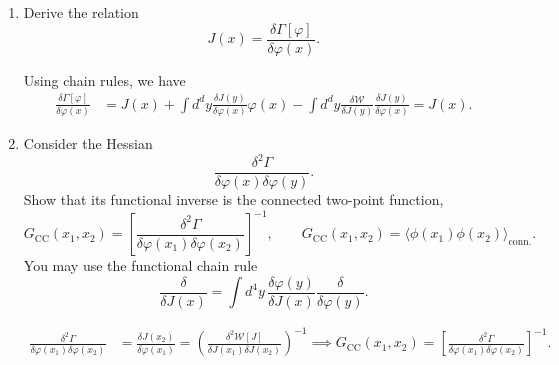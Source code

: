 \begin{enumerate}[label=\alph*)]
    \item Derive the relation
    \begin{equation}
        J(x)=\frac{\delta\Gamma[\varphi]}{\delta\varphi(x)}.
    \end{equation}
    \begin{solution}
    Using chain rules, we have
        \begin{equation}
            \begin{aligned}
                \frac{\delta\Gamma[\varphi]}{\delta\varphi(x)}
                &= J(x) + \int d^dy\frac{\delta J(y)}{\delta\varphi(x)}\varphi(x) - \int d^dy\frac{\delta \mathcal{W}}{\delta J(y)}\frac{\delta J(y)}{\delta    \varphi(x)}=J(x).
            \end{aligned}
        \end{equation}
    \end{solution}

    \item Consider the Hessian
    \begin{equation}
        \frac{\delta^2\Gamma}
             {\delta\varphi(x)\delta\varphi(y)}.
    \end{equation}
    Show that its functional inverse is the connected two-point function,
    \begin{equation}
        G_{\mathrm{CC}}(x_1,x_2)
        =\left[
            \frac{\delta^2\Gamma}
                 {\delta\varphi(x_1)\delta\varphi(x_2)}
        \right]^{-1},
        \qquad
        G_{\mathrm{CC}}(x_1,x_2)
        =\langle\phi(x_1)\phi(x_2)\rangle_{\mathrm{conn.}}.
    \end{equation}
    You may use the functional chain rule
    \begin{equation}
        \frac{\delta}{\delta J(x)}
        =\int d^4y\,
        \frac{\delta\varphi(y)}{\delta J(x)}
        \frac{\delta}{\delta\varphi(y)}.
    \end{equation}
    \begin{solution}
        \begin{equation}
            \begin{aligned}
                \frac{\delta^2\Gamma}
             {\delta\varphi(x_1)\delta\varphi(x_2)} &= \frac{\delta J(x_2)}{\delta \varphi(x_1)} = \left(\frac{\delta^2\mathcal{W}[J]}{\delta J(x_1)\delta J(x_2)}\right)^{-1} \implies G_\mathrm{CC}(x_1,x_2) =\left[
            \frac{\delta^2\Gamma}
                 {\delta\varphi(x_1)\delta\varphi(x_2)}
        \right]^{-1}.
            \end{aligned}
        \end{equation}
    \end{solution}


\end{enumerate}
